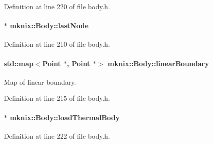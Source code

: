 Definition at line 220 of file body.\+h.

\hypertarget{classmknix_1_1_body_a55bd3106cf4c12c8b4644e48b412f3c9}{}
\paragraph[{last\+Node}]{$\ast$ mknix\+::\+Body\+::last\+Node\hspace{0.3cm}{\ttfamily [protected]}}\label{classmknix_1_1_body_a55bd3106cf4c12c8b4644e48b412f3c9}


Definition at line 210 of file body.\+h.

\hypertarget{classmknix_1_1_body_afd47959808ee823dff7457a535153ea0}{}
\paragraph[{linear\+Boundary}]{\setlength{\rightskip}{0pt plus 5cm}std\+::map$<${\bf Point} $\ast$, {\bf Point} $\ast$$>$ mknix\+::\+Body\+::linear\+Boundary\hspace{0.3cm}{\ttfamily [protected]}}\label{classmknix_1_1_body_afd47959808ee823dff7457a535153ea0}
Map of linear boundary. 

Definition at line 215 of file body.\+h.

\hypertarget{classmknix_1_1_body_aef21ef0ead5775597ca38a9304a26682}{}
\paragraph[{load\+Thermal\+Body}]{$\ast$ mknix\+::\+Body\+::load\+Thermal\+Body\hspace{0.3cm}{\ttfamily [protected]}}\label{classmknix_1_1_body_aef21ef0ead5775597ca38a9304a26682}


Definition at line 222 of file body.\+h.

\hypertarget{classmknix_1_1_body_acbfce7ce37d4e7f616850da2a5850280}{}
